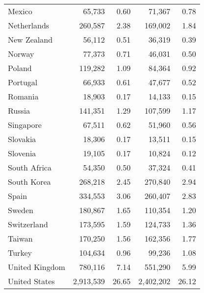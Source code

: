 \begin{tabular}{lrrrr}
Mexico         &    65,733 &         0.60 &    71,367 &         0.78 \\
Netherlands    &   260,587 &         2.38 &   169,002 &         1.84 \\
New Zealand    &    56,112 &         0.51 &    36,319 &         0.39 \\
Norway         &    77,373 &         0.71 &    46,031 &         0.50 \\
Poland         &   119,282 &         1.09 &    84,364 &         0.92 \\
Portugal       &    66,933 &         0.61 &    47,677 &         0.52 \\
Romania        &    18,903 &         0.17 &    14,133 &         0.15 \\
Russia         &   141,351 &         1.29 &   107,599 &         1.17 \\
Singapore      &    67,511 &         0.62 &    51,960 &         0.56 \\
Slovakia       &    18,306 &         0.17 &    13,511 &         0.15 \\
Slovenia       &    19,105 &         0.17 &    10,824 &         0.12 \\
South Africa   &    54,350 &         0.50 &    37,324 &         0.41 \\
South Korea    &   268,218 &         2.45 &   270,840 &         2.94 \\
Spain          &   334,553 &         3.06 &   260,407 &         2.83 \\
Sweden         &   180,867 &         1.65 &   110,354 &         1.20 \\
Switzerland    &   173,595 &         1.59 &   124,733 &         1.36 \\
Taiwan         &   170,250 &         1.56 &   162,356 &         1.77 \\
Turkey         &   104,634 &         0.96 &    99,236 &         1.08 \\
United Kingdom &   780,116 &         7.14 &   551,290 &         5.99 \\
United States  & 2,913,539 &        26.65 & 2,402,202 &        26.12 \\
\bottomrule
\end{tabular}
